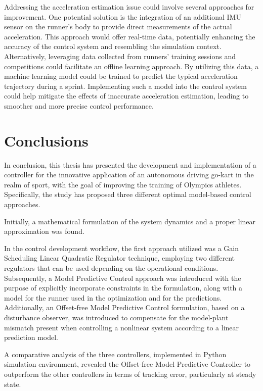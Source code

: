 \documentclass[a4paper,12pt,oneside]{book}
\begin{document}
\bigskip
Addressing the acceleration estimation issue could involve several approaches for improvement.
One potential solution is the integration of an additional IMU sensor on the runner's body to provide direct measurements of the actual acceleration. 
This approach would offer real-time data, potentially enhancing the accuracy of the control system and resembling the simulation context.
Alternatively, leveraging data collected from runners' training sessions and competitions could facilitate an offline learning approach.
By utilizing this data, a machine learning model could be trained to predict the typical acceleration trajectory during a sprint.
Implementing such a model into the control system could help mitigate the effects of inaccurate acceleration estimation, leading to smoother and more precise control performance.



\chapter*{Conclusions}

In conclusion, this thesis has presented the development and implementation of a controller for the innovative application of an autonomous driving go-kart in the realm of sport, with the goal of improving the training of Olympics athletes.
Specifically, the study has proposed three different optimal model-based control approaches.

Initially, a mathematical formulation of the system dynamics and a proper linear approximation was found.

In the control development workflow, the first approach utilized was a Gain Scheduling Linear Quadratic Regulator technique, employing two different regulators that can be used depending on the operational conditions.
Subsequently, a Model Predictive Control approach was introduced with the purpose of explicitly incorporate constraints in the formulation, along with a model for the runner used in the optimization and for the predictions.
Additionally, an Offset-free Model Predictive Control formulation, based on a disturbance observer, was introduced to compensate for the model-plant mismatch present when controlling a nonlinear system according to a linear prediction model.

A comparative analysis of the three controllers, implemented in Python simulation environment, revealed the Offset-free Model Predictive Controller to outperform the other controllers in terms of tracking error, particularly at steady state.
\end{document}
